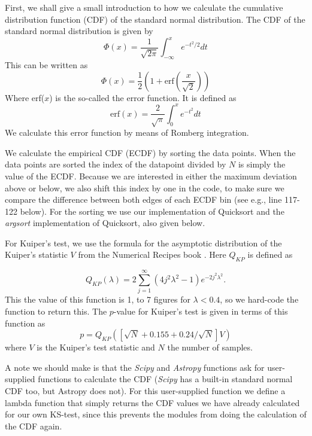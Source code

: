 First, we shall give a small introduction to how we calculate the cumulative distribution function (CDF) of the standard normal distribution. The CDF of the standard normal distribution is given by
\begin{equation}
\Phi(x) = \frac{1}{\sqrt{2\pi}} \int_{-\infty}^x e^{-t^2/2} dt
\end{equation}
This can be written as 
\begin{equation}
\Phi(x) = \frac{1}{2} \left( 1+\mathrm{erf}\left(\frac{x}{\sqrt{2}} \right) \right)
\end{equation}
Where erf($x$) is the so-called the error function. It is defined as 
\begin{equation}
\mathrm{erf}(x) = \frac{2}{\sqrt{\pi}} \int_{0}^x e^{-t^2} dt
\end{equation}
We calculate this error function by means of Romberg integration.

We calculate the empirical CDF (ECDF) by sorting the data points. When the data points are sorted the index of the datapoint divided by $N$ is simply the value of the ECDF. Because we are interested in either the maximum deviation above or below, we also shift this index by one in the code, to make sure we compare the difference between both edges of each ECDF bin (see e.g., line 117-122 below). For the sorting we use our implementation of Quicksort and the \textit{argsort} implementation of Quicksort, also given below.

For Kuiper's test, we use the formula for the asymptotic distribution of the Kuiper's statistic $V$ from the Numerical Recipes book \citep{Press:2007:NRE:1403886}. Here $Q_{KP}$ is defined as

\begin{equation}
Q_{KP}(\lambda) = 2\sum_{j=1}^{\infty} (4j^2\lambda^2-1)e^{-2j^2\lambda^2}.
\end{equation}
This the value of this function is 1, to 7 figures for $\lambda < 0.4$, so we hard-code the function to return this. The $p$-value for Kuiper's test is given in terms of this function as
\begin{equation}
p = Q_{KP} \left( [\sqrt{N} + 0.155 +0.24/\sqrt{N}]V\right)
\end{equation}
where $V$ is the Kuiper's test statistic and $N$ the number of samples.



A note we should make is that the \textit{Scipy} and \textit{Astropy} functions ask for user-supplied functions to calculate the CDF (\textit{Scipy} has a built-in standard normal CDF too, but Astropy does not). For this user-supplied function we define a lambda function that simply returns the CDF values we have already calculated for our own KS-test, since this prevents the modules from doing the calculation of the CDF again.

